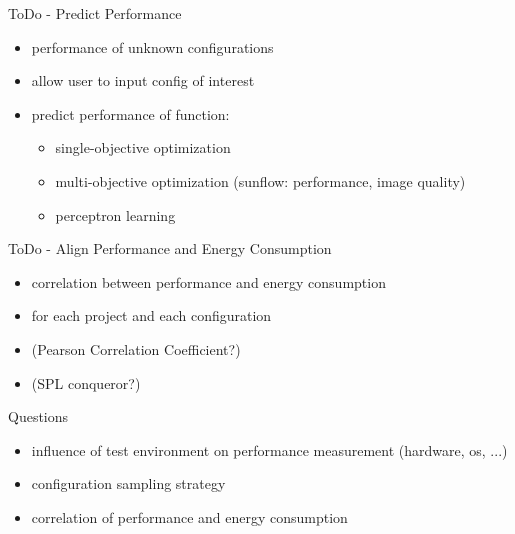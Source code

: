 \documentclass[11pt,aspectratio=169]{beamer}
\begin{document}
\begin{frame}{ToDo - Predict Performance}
  \begin{itemize}
    \item performance of unknown configurations
    \item allow user to input config of interest
    \item predict performance of function:
    \begin{itemize}
      \item single-objective optimization
      \item multi-objective optimization (sunflow: performance, image quality)
      \item perceptron learning      
    \end{itemize}
  \end{itemize}
\end{frame}

\begin{frame}{ToDo - Align Performance and Energy Consumption}
  \begin{itemize}
    \item correlation between performance and energy consumption 
    \item for each project and each configuration
    \item (Pearson Correlation Coefficient?)
    \item (SPL conqueror?)
  \end{itemize}
\end{frame}

\begin{frame}{Questions}
  \begin{itemize}
    \item influence of test environment on performance measurement (hardware, os, ...)
    \item configuration sampling strategy
    \item correlation of performance and energy consumption
  \end{itemize}
\end{frame}

\end{document}
